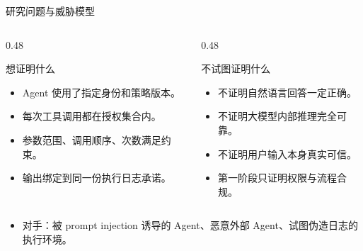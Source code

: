 \documentclass[aspectratio=169]{beamer}
\begin{document}
\begin{frame}{研究问题与威胁模型}
  \begin{columns}[T,onlytextwidth]
    \begin{column}{0.48\textwidth}
      \begin{block}{想证明什么}
        \begin{itemize}
          \item Agent 使用了指定身份和策略版本。
          \item 每次工具调用都在授权集合内。
          \item 参数范围、调用顺序、次数满足约束。
          \item 输出绑定到同一份执行日志承诺。
        \end{itemize}
      \end{block}
    \end{column}
    \begin{column}{0.48\textwidth}
      \begin{block}{不试图证明什么}
        \begin{itemize}
          \item 不证明自然语言回答一定正确。
          \item 不证明大模型内部推理完全可靠。
          \item 不证明用户输入本身真实可信。
          \item 第一阶段只证明权限与流程合规。
        \end{itemize}
      \end{block}
    \end{column}
  \end{columns}
  \vspace{0.3em}
  \begin{itemize}
    \item 对手：被 prompt injection 诱导的 Agent、恶意外部 Agent、试图伪造日志的执行环境。
  \end{itemize}
\end{frame}
\end{document}
